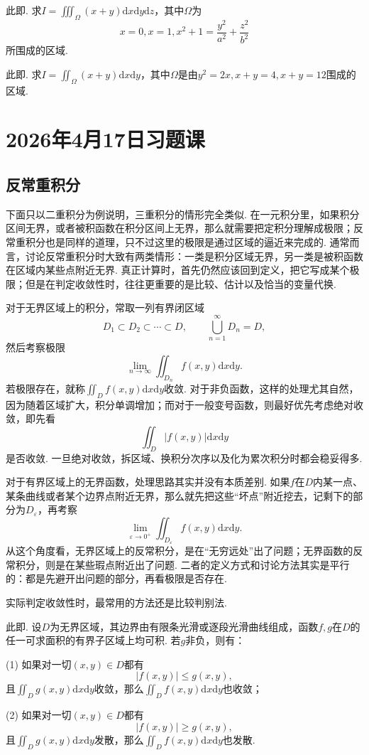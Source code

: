 \documentclass{ctexart}
\newcounter{EnvironmentCounter}
\newcommand{\renewEnvironmentCounter}{\setcounter{EnvironmentCounter}{0}}
\begin{document}
\begin{exercise}
此即\cite[例题22.3.2]{XHM}. 求$I=\iiint_{\Omega}{(x+y)\mathrm{d}x\mathrm{d}y\mathrm{d}z}$，其中$\Omega$为
$$x=0,x=1,x^{2}+1=\frac{y^{2}}{a^{2}}+\frac{z^{2}}{b^{2}}$$
所围成的区域.
\end{exercise}

\begin{exercise}
此即\cite[例题22.2.9]{XHM}. 求$I=\iint_{\Omega}{(x+y)\mathrm{d}x\mathrm{d}y}$，其中$\Omega$是由$y^{2}=2x,x+y=4,x+y=12$围成的区域.
\end{exercise}


\clearpage
\renewEnvironmentCounter
\section{2026年4月17日习题课}
\subsection{反常重积分}

下面只以二重积分为例说明，三重积分的情形完全类似. 在一元积分里，如果积分区间无界，或者被积函数在积分区间上无界，那么就需要把定积分理解成极限；反常重积分也是同样的道理，只不过这里的极限是通过区域的逼近来完成的. 通常而言，讨论反常重积分时大致有两类情形：一类是积分区域无界，另一类是被积函数在区域内某些点附近无界. 真正计算时，首先仍然应该回到定义，把它写成某个极限；但是在判定收敛性时，往往更重要的是比较、估计以及恰当的变量代换.

对于无界区域上的积分，常取一列有界闭区域
$$D_{1}\subset D_{2}\subset\cdots\subset D,\qquad \bigcup_{n=1}^{\infty}D_{n}=D,$$
然后考察极限
$$\lim_{n\to\infty}\iint_{D_{n}}f(x,y)\mathrm{d}x\mathrm{d}y.$$
若极限存在，就称$\iint_{D}f(x,y)\mathrm{d}x\mathrm{d}y$收敛. 对于非负函数，这样的处理尤其自然，因为随着区域扩大，积分单调增加；而对于一般变号函数，则最好优先考虑绝对收敛，即先看
$$\iint_{D}|f(x,y)|\mathrm{d}x\mathrm{d}y$$
是否收敛. 一旦绝对收敛，拆区域、换积分次序以及化为累次积分时都会稳妥得多.

对于有界区域上的无界函数，处理思路其实并没有本质差别. 如果$f$在$D$内某一点、某条曲线或者某个边界点附近无界，那么就先把这些“坏点”附近挖去，记剩下的部分为$D_{\varepsilon}$，再考察
$$\lim_{\varepsilon\to 0^{+}}\iint_{D_{\varepsilon}}f(x,y)\mathrm{d}x\mathrm{d}y.$$
从这个角度看，无界区域上的反常积分，是在“无穷远处”出了问题；无界函数的反常积分，则是在某些瑕点附近出了问题. 二者的定义方式和讨论方法其实是平行的：都是先避开出问题的部分，再看极限是否存在.

实际判定收敛性时，最常用的方法还是比较判别法.
\begin{theorem}[比较判别法]
此即\cite[22.4.2节中的比较判别法]{XHM}. 设$D$为无界区域，其边界由有限条光滑或逐段光滑曲线组成，函数$f,g$在$D$的任一可求面积的有界子区域上均可积. 若$g$非负，则有：

(1) 如果对一切$(x,y)\in D$都有
$$|f(x,y)|\leqslant g(x,y),$$
且$\iint_{D}{g(x,y)\mathrm{d}x\mathrm{d}y}$收敛，那么$\iint_{D}{f(x,y)\mathrm{d}x\mathrm{d}y}$也收敛；

(2) 如果对一切$(x,y)\in D$都有
$$|f(x,y)|\geqslant g(x,y),$$
且$\iint_{D}{g(x,y)\mathrm{d}x\mathrm{d}y}$发散，那么$\iint_{D}{f(x,y)\mathrm{d}x\mathrm{d}y}$也发散.
\end{theorem}
\end{document}
